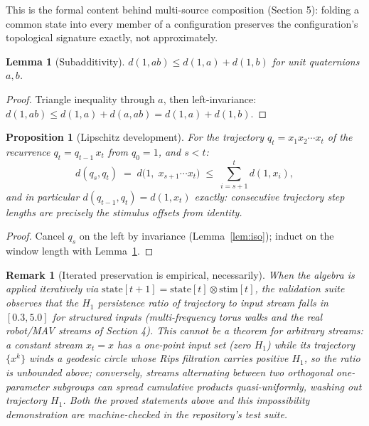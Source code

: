 \documentclass[11pt]{article}
\newtheorem{proposition}{Proposition}
\newtheorem{lemma}{Lemma}
\newtheorem{remark}{Remark}
\begin{document}
This is the formal content behind multi-source composition (Section 5):
folding a common state into every member of a configuration preserves the
configuration's topological signature exactly, not approximately.

\begin{lemma}[Subadditivity]\label{lem:sub}
$d(1, ab) \le d(1, a) + d(1, b)$ for unit quaternions $a, b$.
\end{lemma}

\begin{proof}
Triangle inequality through $a$, then left-invariance:
$d(1, ab) \le d(1, a) + d(a, ab) = d(1, a) + d(1, b)$.
\end{proof}

\begin{proposition}[Lipschitz development]\label{prop:dev}
For the trajectory $q_t = x_1 x_2 \cdots x_t$ of the recurrence
$q_t = q_{t-1}\, x_t$ from $q_0 = 1$, and $s < t$:
\[
d(q_s, q_t) \;=\; d\bigl(1,\; x_{s+1} \cdots x_t\bigr)
  \;\le\; \sum_{i=s+1}^{t} d(1, x_i),
\]
and in particular $d(q_{t-1}, q_t) = d(1, x_t)$ exactly: consecutive
trajectory step lengths are precisely the stimulus offsets from identity.
\end{proposition}

\begin{proof}
Cancel $q_s$ on the left by invariance (Lemma~\ref{lem:iso}); induct on the
window length with Lemma~\ref{lem:sub}.
\end{proof}

\begin{remark}[Iterated preservation is empirical, necessarily]\label{rem:emp}
When the algebra is applied iteratively via $\mathrm{state}[t{+}1] =
\mathrm{state}[t] \otimes \mathrm{stim}[t]$, the validation suite observes
that the $H_1$ persistence ratio of trajectory to input stream falls in
$[0.3, 5.0]$ for structured inputs (multi-frequency torus walks and the
real robot/MAV streams of Section 4). This cannot be a theorem for
arbitrary streams: a \emph{constant} stream $x_t = x$ has a one-point input
set (zero $H_1$) while its trajectory $\{x^k\}$ winds a geodesic circle
whose Rips filtration carries positive $H_1$, so the ratio is unbounded
above; conversely, streams alternating between two orthogonal one-parameter
subgroups can spread cumulative products quasi-uniformly, washing out
trajectory $H_1$. Both the proved statements above and this impossibility
demonstration are machine-checked in the repository's test suite.
\end{remark}
\end{document}
